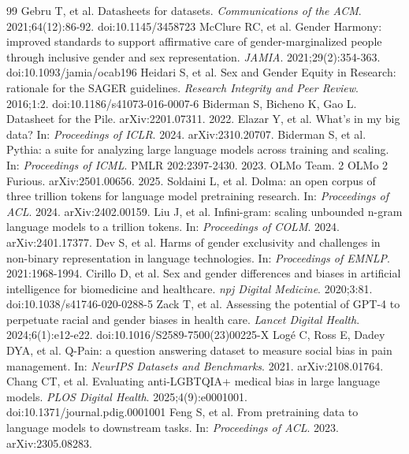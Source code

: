 \documentclass[11pt,twocolumn]{article}
\begin{document}
\clearpage
\begin{thebibliography}{99}
\small
 Gebru T, et al. Datasheets for datasets. \emph{Communications of the ACM}. 2021;64(12):86-92. doi:10.1145/3458723
 McClure RC, et al. Gender Harmony: improved standards to support affirmative care of gender-marginalized people through inclusive gender and sex representation. \emph{JAMIA}. 2021;29(2):354-363. doi:10.1093/jamia/ocab196
 Heidari S, et al. Sex and Gender Equity in Research: rationale for the SAGER guidelines. \emph{Research Integrity and Peer Review}. 2016;1:2. doi:10.1186/s41073-016-0007-6
 Biderman S, Bicheno K, Gao L. Datasheet for the Pile. arXiv:2201.07311. 2022.
 Elazar Y, et al. What's in my big data? In: \emph{Proceedings of ICLR}. 2024. arXiv:2310.20707.
 Biderman S, et al. Pythia: a suite for analyzing large language models across training and scaling. In: \emph{Proceedings of ICML}. PMLR 202:2397-2430. 2023.
 OLMo Team. 2 OLMo 2 Furious. arXiv:2501.00656. 2025.
 Soldaini L, et al. Dolma: an open corpus of three trillion tokens for language model pretraining research. In: \emph{Proceedings of ACL}. 2024. arXiv:2402.00159.
 Liu J, et al. Infini-gram: scaling unbounded n-gram language models to a trillion tokens. In: \emph{Proceedings of COLM}. 2024. arXiv:2401.17377.
 Dev S, et al. Harms of gender exclusivity and challenges in non-binary representation in language technologies. In: \emph{Proceedings of EMNLP}. 2021:1968-1994.
 Cirillo D, et al. Sex and gender differences and biases in artificial intelligence for biomedicine and healthcare. \emph{npj Digital Medicine}. 2020;3:81. doi:10.1038/s41746-020-0288-5
 Zack T, et al. Assessing the potential of GPT-4 to perpetuate racial and gender biases in health care. \emph{Lancet Digital Health}. 2024;6(1):e12-e22. doi:10.1016/S2589-7500(23)00225-X
 Log\'e C, Ross E, Dadey DYA, et al. Q-Pain: a question answering dataset to measure social bias in pain management. In: \emph{NeurIPS Datasets and Benchmarks}. 2021. arXiv:2108.01764.
 Chang CT, et al. Evaluating anti-LGBTQIA+ medical bias in large language models. \emph{PLOS Digital Health}. 2025;4(9):e0001001. doi:10.1371/journal.pdig.0001001
 Feng S, et al. From pretraining data to language models to downstream tasks. In: \emph{Proceedings of ACL}. 2023. arXiv:2305.08283.

\end{thebibliography}
\end{document}
